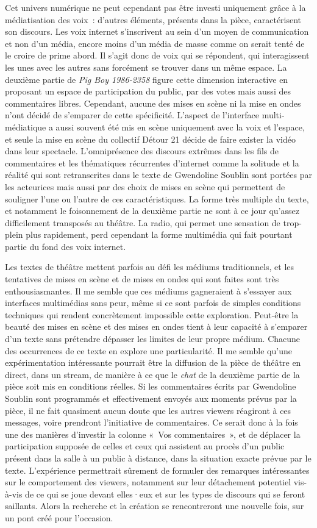 \documentclass[
]{article}
\begin{document}
Cet univers numérique ne peut cependant pas être investi uniquement grâce à la médiatisation des voix~: d'autres éléments, présents dans la pièce, caractérisent son discours. Les voix internet s'inscrivent au sein d'un moyen de communication et non d'un média, encore moins d'un média de masse comme on serait tenté de le croire de prime abord. Il s'agit donc de voix qui se répondent, qui interagissent les unes avec les autres sans forcément se trouver dans un même espace. La deuxième partie de \emph{Pig Boy 1986-2358} figure cette dimension interactive en proposant un espace de participation du public, par des votes mais aussi des commentaires libres. Cependant, aucune des mises en scène ni la mise en ondes n'ont décidé de s'emparer de cette spécificité. L'aspect de l'interface multi-médiatique a aussi souvent été mis en scène uniquement avec la voix et l'espace, et seule la mise en scène du collectif Détour 21 décide de faire exister la vidéo dans leur spectacle. L'omniprésence des discours extrêmes dans les fils de commentaires et les thématiques récurrentes d'internet comme la solitude et la réalité qui sont retranscrites dans le texte de Gwendoline Soublin sont portées par les acteurices mais aussi par des choix de mises en scène qui permettent de souligner l'une ou l'autre de ces caractéristiques. La forme très multiple du texte, et notamment le foisonnement de la deuxième partie ne sont à ce jour qu'assez difficilement transposés au théâtre. La radio, qui permet une sensation de trop-plein plus rapidement, perd cependant la forme multimédia qui fait pourtant partie du fond des voix internet.

Les textes de théâtre mettent parfois au défi les médiums traditionnels, et les tentatives de mises en scène et de mises en ondes qui sont faites sont très enthousiasmantes. Il me semble que ces médiums gagneraient à s'essayer aux interfaces multimédias sans peur, même si ce sont parfois de simples conditions techniques qui rendent concrètement impossible cette exploration. Peut-être la beauté des mises en scène et des mises en ondes tient à leur capacité à s'emparer d'un texte sans prétendre dépasser les limites de leur propre médium. Chacune des occurrences de ce texte en explore une particularité. Il me semble qu'une expérimentation intéressante pourrait être la diffusion de la pièce de théâtre en direct, dans un stream, de manière à ce que le \emph{chat} de la deuxième partie de la pièce soit mis en conditions réelles. Si les commentaires écrits par Gwendoline Soublin sont programmés et effectivement envoyés aux moments prévus par la pièce, il ne fait quasiment aucun doute que les autres viewers réagiront à ces messages, voire prendront l'initiative de commentaires. Ce serait donc à la fois une des manières d'investir la colonne «~Vos commentaires~», et de déplacer la participation supposée de celles et ceux qui assistent au procès d'un public présent dans la salle à un public à distance, dans la situation exacte prévue par le texte. L'expérience permettrait sûrement de formuler des remarques intéressantes sur le comportement des viewers, notamment sur leur détachement potentiel vis-à-vis de ce qui se joue devant elles·eux et sur les types de discours qui se feront saillants. Alors la recherche et la création se rencontreront une nouvelle fois, sur un pont créé pour l'occasion.
\end{document}
